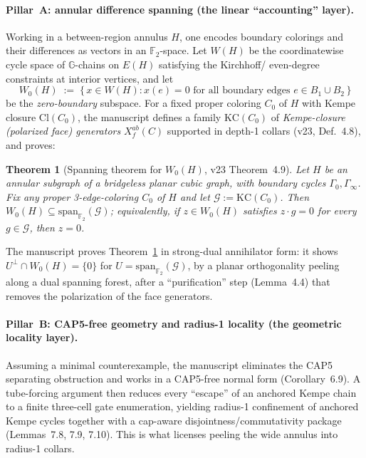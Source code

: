 \documentclass[11pt]{article}
\newtheorem{theorem}{Theorem}
\theoremstyle{definition}
\newcommand{\GG}{\mathbb{G}}
\newcommand{\FF}{\mathbb{F}_2}
\newcommand{\Wz}{W_0}
\newcommand{\Cl}{\mathrm{Cl}}
\newcommand{\KC}{\mathrm{KC}}
\begin{document}
\paragraph{Pillar~A: annular difference spanning (the linear ``accounting''
layer).} Working in a between-region annulus $H$, one encodes boundary
colorings and their differences as vectors in an $\FF$-space. Let $W(H)$ be the
coordinatewise cycle space of $\GG$-chains on $E(H)$ satisfying the Kirchhoff/\allowbreak
even-degree constraints at interior vertices, and let
\[
  \Wz(H) \;:=\; \{\,x\in W(H) : x(e)=0 \text{ for all boundary edges } e\in
  B_1\cup B_2\,\}
\]
be the \emph{zero-boundary} subspace. For a fixed proper coloring $C_0$ of $H$
with Kempe closure $\Cl(C_0)$, the manuscript defines a family $\KC(C_0)$ of
\emph{Kempe-closure (polarized face) generators} $X_f^{ab}(C)$ supported in
depth-1 collars (v23, Def.~4.8), and proves:
\begin{theorem}[Spanning theorem for $\Wz(H)$, v23 Theorem~4.9]
\label{thm:49}
Let $H$ be an annular subgraph of a bridgeless planar cubic graph, with
boundary cycles $\Gamma_0,\Gamma_\infty$. Fix any proper 3-edge-coloring $C_0$
of $H$ and let $\mathcal{G}:=\KC(C_0)$. Then
$\Wz(H)\subseteq\mathrm{span}_{\FF}(\mathcal{G})$; equivalently, if
$z\in\Wz(H)$ satisfies $z\cdot g=0$ for every $g\in\mathcal{G}$, then $z=0$.
\end{theorem}
The manuscript proves Theorem~\ref{thm:49} in strong-dual annihilator form: it
shows $U^{\perp}\cap\Wz(H)=\{0\}$ for $U=\mathrm{span}_{\FF}(\mathcal{G})$, by a
planar orthogonality peeling along a dual spanning forest, after a
``purification'' step (Lemma~4.4) that removes the polarization of the face
generators.

\paragraph{Pillar~B: CAP5-free geometry and radius-1 locality (the geometric
locality layer).} Assuming a minimal counterexample, the manuscript eliminates
the CAP5 separating obstruction and works in a CAP5-free normal form
(Corollary~6.9). A tube-forcing argument then reduces every ``escape'' of an
anchored Kempe chain to a finite three-cell gate enumeration, yielding radius-1
confinement of anchored Kempe cycles together with a cap-aware
disjointness/commutativity package (Lemmas~7.8, 7.9, 7.10). This is what
licenses peeling the wide annulus into radius-1 collars.
\end{document}

